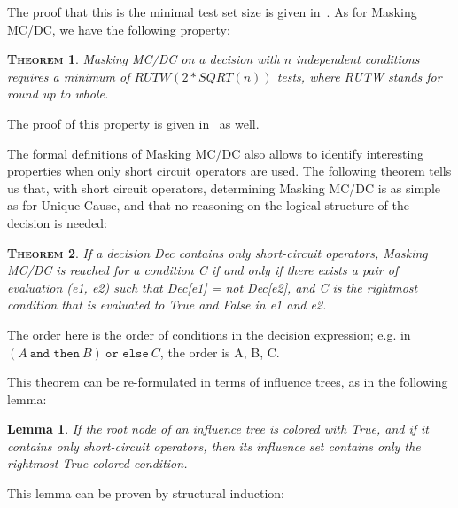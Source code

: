\documentclass[a4paper,12pt,twoside]{article}
\newcommand{\andthen}{\texttt{and then}}
\newcommand{\orelse}{\texttt{or else}}
\newtheorem{theorem}{\textsc{Theorem}}
\newtheorem{lemma}{Lemma}[subsection]
\begin{document}
The proof that this is the minimal test set size is given in~\cite{ar0118}.
As for Masking MC/DC, we have the following property:

\begin{theorem}
Masking MC/DC on a decision with $n$ independent conditions requires a
minimum of $RUTW(2*SQRT(n))$ tests, where RUTW stands for round up to
whole.
\end{theorem}

The proof of this property is given in~\cite{ar0118} as well.

The formal definitions of Masking MC/DC also allows to identify
interesting properties when only short circuit operators are used.
The following theorem tells us that, with short circuit operators,
determining Masking MC/DC is as simple as for Unique Cause, and
that no reasoning on the logical structure of the decision is needed:

\begin{theorem}
  \label{thm:masking-short-circuit}
  If a decision Dec contains only short-circuit operators, Masking MC/DC is
  reached for a condition C if and only if there exists a pair of evaluation
  (e1, e2) such that Dec[e1] = not Dec[e2], and C is the rightmost
  condition that is evaluated to True and False in e1 and e2.
\end{theorem}

The order here is the order of conditions in the decision expression; e.g.
in $(A \ \andthen{} \ B) \ \orelse{} \ C$, the order is A, B, C.

This theorem can be re-formulated in terms of influence trees, as in the
following lemma:

\begin{lemma}
  \label{lemma:short-circuit-influence-set}
  If the root node of an influence tree is colored with True, and
  if it contains only short-circuit operators, then its influence
  set contains only the rightmost True-colored condition.
\end{lemma}

This lemma can be proven by structural induction:
\end{document}
